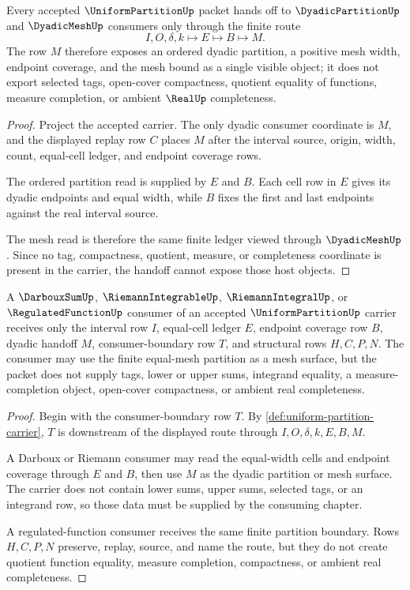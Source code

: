 \begin{theorem}
\label{thm:uniform-partition-dyadic-mesh-handoff}
Every accepted $\UniformPartitionUp$ packet hands off to $\DyadicPartitionUp$ and $\DyadicMeshUp$ consumers only through the finite route
$$
I,O,\delta,k \longmapsto E \longmapsto B \longmapsto M .
$$
The row $M$ therefore exposes an ordered dyadic partition, a positive mesh width, endpoint coverage, and the mesh bound as a single visible object; it does not export selected tags, open-cover compactness, quotient equality of functions, measure completion, or ambient $\RealUp$ completeness.
\end{theorem}
\begin{proof}
Project the accepted carrier. The only dyadic consumer coordinate is $M$, and the displayed replay row $C$ places $M$ after the interval source, origin, width, count, equal-cell ledger, and endpoint coverage rows.

The ordered partition read is supplied by $E$ and $B$. Each cell row in $E$ gives its dyadic endpoints and equal width, while $B$ fixes the first and last endpoints against the real interval source.

The mesh read is therefore the same finite ledger viewed through $\DyadicMeshUp$. Since no tag, compactness, quotient, measure, or completeness coordinate is present in the carrier, the handoff cannot expose those host objects.
\end{proof}

\begin{theorem}
\label{thm:uniform-partition-integration-consumer-boundary}
A $\DarbouxSumUp$, $\RiemannIntegrableUp$, $\RiemannIntegralUp$, or $\RegulatedFunctionUp$ consumer of an accepted $\UniformPartitionUp$ carrier receives only the interval row $I$, equal-cell ledger $E$, endpoint coverage row $B$, dyadic handoff $M$, consumer-boundary row $T$, and structural rows $H,C,P,N$. The consumer may use the finite equal-mesh partition as a mesh surface, but the packet does not supply tags, lower or upper sums, integrand equality, a measure-completion object, open-cover compactness, or ambient real completeness.
\end{theorem}
\begin{proof}
Begin with the consumer-boundary row $T$. By \autoref{def:uniform-partition-carrier}, $T$ is downstream of the displayed route through $I,O,\delta,k,E,B,M$.

A Darboux or Riemann consumer may read the equal-width cells and endpoint coverage through $E$ and $B$, then use $M$ as the dyadic partition or mesh surface. The carrier does not contain lower sums, upper sums, selected tags, or an integrand row, so those data must be supplied by the consuming chapter.

A regulated-function consumer receives the same finite partition boundary. Rows $H,C,P,N$ preserve, replay, source, and name the route, but they do not create quotient function equality, measure completion, compactness, or ambient real completeness.
\end{proof}

